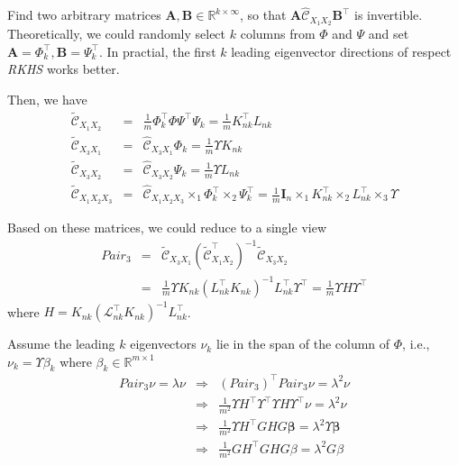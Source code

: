\documentclass{article}
\begin{document}
Find two arbitrary matrices $\bm{A,B}\in \mathbb{R}^{k \times \infty}$, so that $\bm{A}\hat{\mathcal{C}}_{X_1X_2}\bm{B}^\top$ is invertible. Theoretically, we could randomly select $k$ columns from $\Phi$ and $\Psi$ and set $\bm{A} = \Phi_k^\top, \bm{B} = \Psi_k^\top$. In practial, the first $k$ leading eigenvector directions of respect \emph{RKHS} works better.

 Then, we have
%
\begin{eqnarray*}
\tilde{\mathcal{C}}_{X_1 X_2} &=& \frac{1}{m}\Phi_k^\top\Phi\Psi^\top\Psi_k = \frac{1}{m}{K}_{nk}^\top{L}_{nk}\\
\tilde{\mathcal{C}}_{X_3 X_1} &=& \hat{\mathcal{C}}_{X_3X_1}\Phi_k = \frac{1}{m}\Upsilon{K}_{nk}\\
\tilde{\mathcal{C}}_{X_3 X_2} &=& \hat{\mathcal{C}}_{X_3X_2}\Psi_k = \frac{1}{m}\Upsilon{L}_{nk}\\
\tilde{\mathcal{C}}_{X_1 X_2 X_3} &=&
\hat{\mathcal{C}}_{X_1 X_2 X_3}\times_1\Phi_k^\top
\times_2\Psi_k^\top = \frac{1}{m} \bm{I}_n \times_1
{K}_{nk}^\top \times_2 {L}_{nk}^\top \times_3
\Upsilon
\end{eqnarray*}
%

Based on these matrices, we could reduce to a single view
%
\begin{eqnarray*}
Pair_3 &=&
\tilde{\mathcal{C}}_{X_3X_1}(\tilde{\mathcal{C}}_{X_1X_2}^\top)^{-1}\tilde{\mathcal{C}}_{X_3X_2}\\
&=&\frac{1}{m}\Upsilon{K}_{nk}({L}_{nk}^\top{K}_{nk})^{-1}{L}_{nk}^\top\Upsilon^\top = \frac{1}{m}\Upsilon{H}\Upsilon^\top
\end{eqnarray*}
where ${H} = {K}_{nk}(\mathcal{L}_{nk}^\top{K}_{nk})^{-1}{L}_{nk}^\top$.

Assume the leading $k$ eigenvectors $\nu_k$ lie in the span of the column of $\Phi$, i.e., $\nu_k = \Upsilon \beta_k$ where $\beta_k\in \mathbb{R}^{m\times 1}$
%
\begin{eqnarray*}
Pair_3\nu = \lambda \nu &\Rightarrow& (Pair_3)^\top Pair_3\nu = \lambda^2 \nu \\
&\Rightarrow&
\frac{1}{m^2} \Upsilon{H}^\top\Upsilon^\top\Upsilon{H}\Upsilon^\top\nu
= \lambda^2\nu \\
&\Rightarrow&
\frac{1}{m^2}\Upsilon{H^\top GHG}\bm{\beta} =
\lambda^2 \Upsilon\bm{\beta} \\
&\Rightarrow& \frac{1}{m^2}{GH^\top GHG}\beta
= \lambda^2{G}\beta
\end{eqnarray*}
\end{document}
